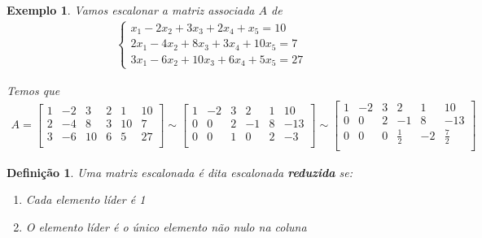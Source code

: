 \documentclass{article}
\newtheorem*{definition}{Definição}
\newtheorem*{example}{Exemplo}
\begin{document}
\begin{example}
	Vamos escalonar a matriz associada $A$ de 
	\begin{align*}
	\begin{cases}
	x_1 - 2x_2 + 3x_3 + 2x_4 + x_5 = 10 \\
	2x_1 - 4x_2 + 8x_3 + 3x_4 + 10x_5 = 7 \\
	3x_1 - 6x_2 + 10x_3 + 6x_4 + 5x_5 = 27
	\end{cases}
	\end{align*}
	\par\vspace{0.3cm} Temos que
	\begin{align*}
	A = \begin{bmatrix}
	1 & -2 & 3 & 2 & 1 & 10 \\
	2 & -4 & 8 & 3 & 10 & 7 \\
	3 & -6 & 10 & 6 & 5 & 27 \\
	\end{bmatrix}
	\sim
	\begin{bmatrix}
	1 & -2 & 3 & 2 & 1 & 10 \\
	0 & 0 & 2 & -1 & 8 & -13 \\
	0 & 0 & 1 & 0 & 2 & -3 \\
	\end{bmatrix}
	\sim
	\begin{bmatrix}
	1 & -2 & 3 & 2 & 1 & 10 \\
	0 & 0 & 2 & -1 & 8 & -13 \\
	0 & 0 & 0 & \frac{1}{2} & -2 & \frac{7}{2} \\
	\end{bmatrix}
	\end{align*}
\end{example}

\begin{definition}
	Uma matriz escalonada é dita escalonada \textbf{reduzida} se:
	\begin{enumerate}
		\item Cada elemento líder é 1
		\item O elemento líder é o único elemento não nulo na coluna
	\end{enumerate}
\end{definition}
\end{document}
